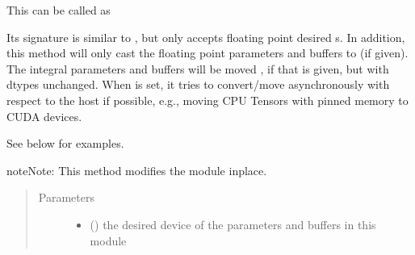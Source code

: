 \documentclass[letterpaper,10pt,english]{sphinxmanual}
\begin{document}
\begin{fulllineitems}
\begin{fulllineitems}
This can be called as

\begin{fulllineitems}
\end{fulllineitems}


\begin{fulllineitems}
\end{fulllineitems}


\begin{fulllineitems}
\end{fulllineitems}


Its signature is similar to , but only accepts
floating point desired  s. In addition, this method will
only cast the floating point parameters and buffers to 
(if given). The integral parameters and buffers will be moved
, if that is given, but with dtypes unchanged. When
 is set, it tries to convert/move asynchronously
with respect to the host if possible, e.g., moving CPU Tensors with
pinned memory to CUDA devices.

See below for examples.

\begin{sphinxadmonition}{note}{Note:}
This method modifies the module in\sphinxhyphen{}place.
\end{sphinxadmonition}
\begin{quote}\begin{description}
\item[{Parameters}] \leavevmode\begin{itemize}
\item {} 
 () \textendash{} the desired device of the parameters
and buffers in this module


\end{itemize}
\end{description}
\end{quote}
\end{fulllineitems}
\end{fulllineitems}
\end{document}
